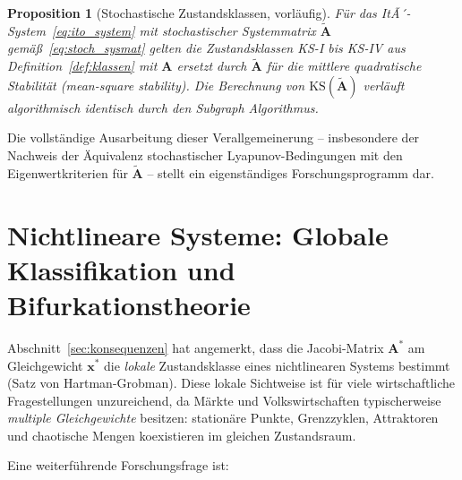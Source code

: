 ﻿\documentclass[12pt, a4paper, titlepage]{report}
\newtheorem{proposition}[theorem]{Proposition}
\theoremstyle{definition}
\theoremstyle{remark}
\newcommand{\vx}{\bm{x}}
\newcommand{\vA}{\bm{A}}
\newcommand{\KS}{\mathrm{KS}}
\begin{document}
\begin{proposition}[Stochastische Zustandsklassen, vorläufig]
Für das ItÃ´-System~\eqref{eq:ito_system} mit stochastischer Systemmatrix $\tilde{\vA}$
gemäß~\eqref{eq:stoch_sysmat} gelten die Zustandsklassen KS-I bis KS-IV aus
Definition~\ref{def:klassen} mit $\vA$ ersetzt durch $\tilde{\vA}$ für die
mittlere quadratische Stabilität (mean-square stability). Die Berechnung von
$\KS(\tilde{\vA})$ verläuft algorithmisch identisch durch den Subgraph Algorithmus.
\end{proposition}

\noindent
Die vollständige Ausarbeitung dieser Verallgemeinerung -- insbesondere der Nachweis
der Äquivalenz stochastischer Lyapunov-Bedingungen mit den Eigenwertkriterien für
$\tilde{\vA}$ -- stellt ein eigenständiges Forschungsprogramm dar.

\section{Nichtlineare Systeme: Globale Klassifikation und Bifurkationstheorie}
\label{subsec:nichtlinear}

Abschnitt~\ref{sec:konsequenzen} hat angemerkt, dass die Jacobi-Matrix $\vA^*$ am
Gleichgewicht $\vx^*$ die \emph{lokale} Zustandsklasse eines nichtlinearen Systems
bestimmt (Satz von Hartman-Grobman). Diese lokale Sichtweise ist für viele wirtschaftliche
Fragestellungen unzureichend, da Märkte und Volkswirtschaften typischerweise
\emph{multiple Gleichgewichte} besitzen: stationäre Punkte, Grenzzyklen, Attraktoren und
chaotische Mengen koexistieren im gleichen Zustandsraum.

Eine weiterführende Forschungsfrage ist:
\end{document}
